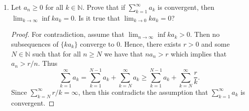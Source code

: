 \documentclass[12pt]{article}
\begin{document}
\begin{enumerate}
\begin{proof}
                $\sum_{k=1}^{\infty}|a_k|$ converges. This contradicts our
                assumption that $\sum_{k=1}^{\infty}a_k$ converges
                conditionally. Therefore $\sum_{k=1}^{\infty}k^2a_k$ is
                divergent. 
            \end{proof}
        \item Let $a_n\geq 0$ for all $k\in\mathbb{N}$. Prove that if
            $\sum_{k=1}^{\infty}a_k$ is convergent, then $\lim_{k\to\infty}\inf
            ka_k=0$. Is it true that $\lim_{k\to 0}ka_k=0$?
            \begin{proof}
                For contradiction, assume that $\lim_{n\to\infty}\inf ka_k>0$.
                Then no subsequences of $\{ka_k\}$ converge to 0. Hence, there
                exists $r>0$ and some $N\in\mathbb{N}$ such that for all $n\geq
                N$ we have that $na_n>r$ which implies that $a_n>r/n$. Thus 
                \begin{equation*}
                    \sum_{k=1}^{\infty}a_k=\sum_{k=1}^{N-1}a_k+\sum_{k=N}^{\infty}a_k
                    \geq \sum_{k=1}^{N-1}a_k+\sum_{k=N}^{\infty}\frac{r}{k}.
                \end{equation*}
                Since $\sum_{k=N}^{\infty}r/k=\infty$, then this contradicts
                the assumption that $\sum_{k=1}^{\infty}a_k$ is convergent. 
            \end{proof}
    \end{enumerate}
\end{document}
